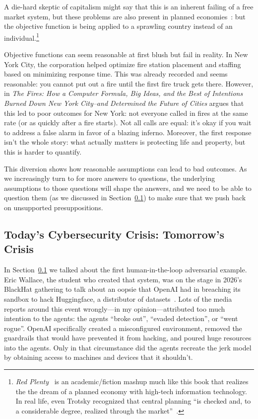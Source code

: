 A die-hard skeptic of capitalism might
 say that this is an inherent
failing of a free market system, but these
 problems are also present
in planned economies~\citep{moroney-97}:
 but the objective function
is being applied to a sprawling country
 instead of an
individual.\footnote{\textit{Red
 Plenty}~\citep{spufford-10} is an
  academic/fiction mashup much like
 this book that realizes the the
  dream of a planned economy with
 high-tech information technology.
  In real life, even Trotsky
 recognized that central planning ``is
  checked and, to a considerable
 degree, realized through the
  market''~\citep{trotsky-32}.}
 
 Objective functions can seem
reasonable at first blush but fail in
 reality.  In New York City,
the  corporation helped optimize
 fire station placement
and staffing based on minimizing response
 time.  This was already
recorded and seems reasonable: you cannot put
 out a fire until the
first fire truck gets there. However, \citet{spufford-10} in
\textit{The Fires: How a Computer
 Formula, Big Ideas, and the Best
  of Intentions Burned Down New York
 City--and Determined the Future
  of Cities} argues that this led to
 poor outcomes for New York: not
everyone called in fires at the same
 rate (or as quickly after a
fire starts).  Not all calls are equal:
 it's okay if you wait to
address a false alarm in favor of a blazing
 inferno.  Moreover, the
first response isn't the whole story: what
 actually matters is
protecting life and property, but this is harder
 to quantify.

This diversion shows how reasonable assumptions can lead to bad outcomes.
%
As we increasingly turn to  for more answers to questions, the
underlying assumptions to those questions will shape the answers, and
we need to be able to question them (as we discussed in
Section~\ref{}) to make sure that we push back on unsupported
presuppositions.

\subsection{Today's Cybersecurity Crisis: Tomorrow's  Crisis}

In Section~\ref{} we talked about the first human-in-the-loop adversarial example.
%
Eric Wallace, the student who created that system, was on the stage in
2026's BlackHat gathering to talk about an oopsie that OpenAI had in
breaching its sandbox to hack Huggingface, a distributor of 
datasets~\cite{}.
%
Lots of the media reports around this event wrongly---in my
opinion---attributed too much intention to the agents: the agents
``broke out'', ``evaded detection'', or ``went rogue''.
%
OpenAI specifically created a misconfigured environment, removed the guardrails that would have prevented it from hacking, and poured huge resources into the agents.
%
Only in that circumstance did the agents recreate the jerk model by
obtaining access to machines and devices that it shouldn't.

